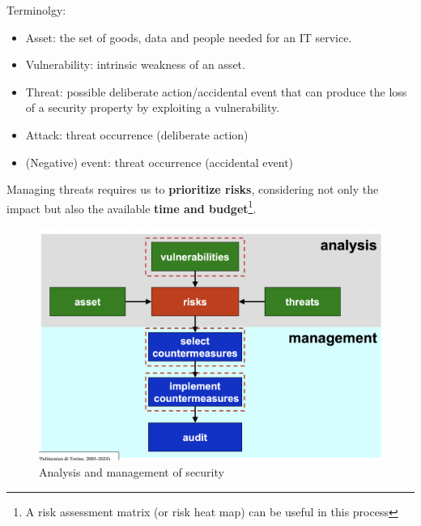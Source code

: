 Terminolgy:
\begin{itemize}
    \item Asset: the set of goods, data and people needed for an IT service.
    \item Vulnerability: intrinsic weakness of an asset.
    \item Threat: possible deliberate action/accidental event that can produce the loss of a security property by exploiting a vulnerability.
    \item Attack: threat occurrence (deliberate action)
    \item (Negative) event: threat occurrence (accidental event)
\end{itemize}

Managing threats requires us to \textbf{prioritize risks}, considering not only the impact but also the available \textbf{time and budget}\footnote{A risk assessment matrix (or risk heat map) can be useful in this process}.

\begin{figure}[H]
    \includegraphics[width=\linewidth]{Images/Introduction/analysisAndManagement.png}
    \caption{Analysis and management of security}
\end{figure}